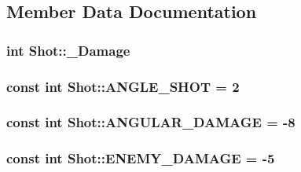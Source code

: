 \subsection{Member Data Documentation}
\hypertarget{class_shot_a1aa9cf447026ba338930899bebde1d4b}{
\subsubsection[{\-\_\-\-Damage}]{\setlength{\rightskip}{0pt plus 5cm}int Shot\-::\-\_\-\-Damage\hspace{0.3cm}{\ttfamily [protected]}}}\label{class_shot_a1aa9cf447026ba338930899bebde1d4b}
\hypertarget{class_shot_a26d13b7f383ca64bb6e775b8dbaba834}{
\subsubsection[{A\-N\-G\-L\-E\-\_\-\-S\-H\-O\-T}]{\setlength{\rightskip}{0pt plus 5cm}const int Shot\-::\-A\-N\-G\-L\-E\-\_\-\-S\-H\-O\-T = 2\hspace{0.3cm}{\ttfamily [static]}}}\label{class_shot_a26d13b7f383ca64bb6e775b8dbaba834}
\hypertarget{class_shot_a795b718149dd6d1ab4162103bd0a31c9}{
\subsubsection[{A\-N\-G\-U\-L\-A\-R\-\_\-\-D\-A\-M\-A\-G\-E}]{\setlength{\rightskip}{0pt plus 5cm}const int Shot\-::\-A\-N\-G\-U\-L\-A\-R\-\_\-\-D\-A\-M\-A\-G\-E = -\/8\hspace{0.3cm}{\ttfamily [static]}}}\label{class_shot_a795b718149dd6d1ab4162103bd0a31c9}
\hypertarget{class_shot_a1f093fa878e873dd07133df7217c0298}{
\subsubsection[{E\-N\-E\-M\-Y\-\_\-\-D\-A\-M\-A\-G\-E}]{\setlength{\rightskip}{0pt plus 5cm}const int Shot\-::\-E\-N\-E\-M\-Y\-\_\-\-D\-A\-M\-A\-G\-E = -\/5\hspace{0.3cm}{\ttfamily [static]}}}\label{class_shot_a1f093fa878e873dd07133df7217c0298}
